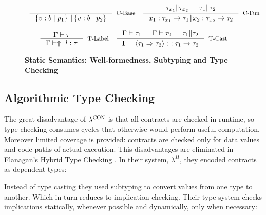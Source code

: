 \begin{figure}[ht!]

\medskip {}
$$\begin{array}{cc}

\inference
  {}
  {\isCompatible{\tref{b}{p_1}}{\tref{b}{p_2}}}
  [\cbase]

&

\inference
  {\isCompatible{\tau_{x_1}}{\tau_{x_2}} &&
   \isCompatible{\tau_1}{\tau_2}}
  {\isCompatible{\tfun{x_1}{\tau_{x_1}}{\tau_1}}{\tfun{x_2}{\tau_{x_2}}{\tau_2}}}
  [\cfunction]
\end{array}$$



\medskip {}
$$\begin{array}{cc}

\inference
  {\isWellFormed{\Gamma}{\tau}}
  {\hastype{\Gamma}{\elabel{l}}{\tau}}
  [\tlabel]

&

\inference
  {\isWellFormed{\Gamma}{\tau_1} &&
   \isWellFormed{\Gamma}{\tau_2} && 
   \isCompatible{\tau_1}{\tau_2}}
  {\hastype{\Gamma}{\ecast{\tau_1}{\tau_2}{}}{\tfun{}{\tau_1}{\tau_2}}}
  [\tcast]
\end{array}$$


\caption{\textbf{Static Semantics: Well-formedness, Subtyping and Type Checking}}
\label{fig:rules}
\end{figure}




\subsection{Algorithmic Type Checking}

The great disadvantage of $\lambda^{\textsc{CON}}$ is that all contracts are checked in runtime, 
so type checking consumes cycles that otherwise would perform useful computation.
Moreover limited coverage is provided: contracts are checked only for data values and
code paths of actual execution.
This disadvantages are eliminated in Flanagan's Hybrid Type Checking \cite{Flanagan06}.
In their system, $\lambda^H$, they encoded contracts as dependent types:


Instead of type casting they used subtyping to convert values from one type to another.
Which in turn reduces to implication checking.
Their type system checks implications statically, whenever possible
and dynamically, only when necessary:


